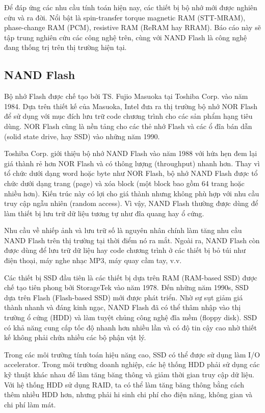 Để đáp ứng các nhu cầu tính toán hiện nay, các thiết bị bộ nhớ mới được nghiên
cứu và ra đời. Nổi bật là spin-transfer torque magnetic RAM (STT-MRAM),
phase-change RAM (PCM), resistive RAM (ReRAM hay RRAM). Báo cáo này sẽ tập
trung nghiên cứu các công nghệ trên, cùng với NAND Flash là công nghệ đang
thống trị trên thị trường hiện tại.

\subsection{NAND Flash}
Bộ nhớ Flash được chế tạo bởi TS. Fujio Masuoka tại Toshiba Corp. vào năm 1984.
Dựa trên thiết kế của Masuoka, Intel đưa ra thị trường bộ nhớ NOR Flash để sử
dụng với mục đích lưu trữ code chương trình cho các sản phẩm hạng tiêu dùng.
NOR Flash cũng là nền tảng cho các thẻ nhớ Flash và các ổ đĩa bán dẫn (solid
state drive, hay SSD) vào những năm 1990.

Toshiba Corp. giới thiệu bộ nhớ NAND Flash vào năm 1988 với hứa hẹn đem lại giá
thành rẻ hơn NOR Flash và có thông lượng (throughput) nhanh hơn. Thay vì tổ
chức dưới dạng word hoặc byte như NOR Flash, bộ nhớ NAND Flash được tổ chức
dưới dạng trang (page) và xóa block (một block bao gồm 64 trang hoặc nhiều
hơn). Kiến trúc này có lợi cho giá thành nhưng không phù hợp với nhu cầu truy
cập ngẫu nhiên (random access). Vì vậy, NAND Flash thường được dùng để làm
thiết bị lưu trữ dữ liệu tương tự như đĩa quang hay ổ cứng.


Nhu cầu về nhiếp ảnh và lưu trữ số là nguyên nhân chính làm tăng nhu cầu NAND
Flash trên thị trường tại thời điểm nó ra mắt. Ngoài ra, NAND Flash còn được
dùng để lưu trữ dữ liệu hay code chương trình ở các thiết bị bỏ túi như điện
thoại, máy nghe nhạc MP3, máy quay cầm tay, v.v.

Các thiết bị SSD đầu tiên là các thiết bị dựa trên RAM (RAM-based SSD) được chế
tạo tiên phong bởi StorageTek vào năm 1978. Đến những năm 1990s, SSD dựa trên
Flash (Flash-based SSD) mới được phát triển. Nhờ sự sụt giảm giá thành nhanh và
đáng kinh ngạc, NAND Flash đã có thể thâm nhập vào thị trường ổ cứng (HDD) và
làm tuyệt chủng công nghệ đĩa mềm (floppy disk). SSD có khả năng cung cấp tốc
độ nhanh hơn nhiều lần và có độ tin cậy cao nhờ thiết kế không phải chứa nhiều
các bộ phận vật lý.

Trong các môi trường tính toán hiệu năng cao, SSD có thể được sử dụng làm I/O
accelerator. Trong môi trường doanh nghiệp, các hệ thống HDD phải sử dụng các
kỹ thuật khác nhau để làm tăng băng thông và giảm thời gian truy cập dữ liệu.
Với hệ thống HDD sử dụng RAID, ta có thể làm tăng băng thông bằng cách thêm
nhiều HDD hơn, nhưng phải hi sinh chi phí cho điện năng, không gian và chi phí
làm mát.

